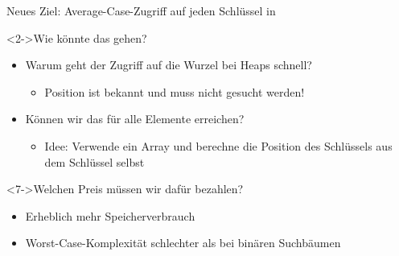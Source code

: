 \begin{frame}
    \begin{block}{Neues Ziel: Average-Case-Zugriff auf jeden Schlüssel in \alert{\oconst}}
    \end{block}
    \begin{block}<2->{Wie könnte das gehen?}
        \begin{itemize}
            \item<3-> Warum geht der Zugriff auf die Wurzel bei Heaps schnell?
            \begin{itemize}
                \item<4-> Position ist bekannt und muss nicht gesucht werden!
            \end{itemize}
            \item<5-> Können wir das für alle Elemente erreichen?
            \begin{itemize}
                \item<6-> Idee: Verwende ein Array und berechne
                      die Position des Schlüssels aus dem Schlüssel selbst
            \end{itemize}
        \end{itemize}
    \end{block}
    \begin{block}<7->{Welchen Preis müssen wir dafür bezahlen?}
        \begin{itemize}
            \item<8-> Erheblich mehr Speicherverbrauch 
            \item<8-> Worst-Case-Komplexität schlechter als bei binären Suchbäumen
        \end{itemize}
    \end{block}
\end{frame}